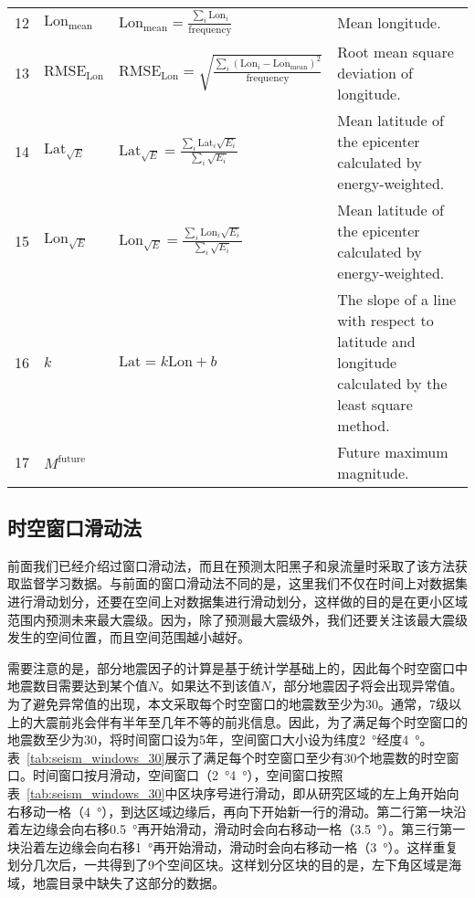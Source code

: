 \begin{table}[htpb]
{\begin{tabular}{llll}
  12 & $\mathrm{Lon}_{\mathrm{mean}}$ & $\displaystyle \mathrm{Lon}_{\mathrm{mean}}=\frac{\sum_i{\mathrm{Lon}_i}}{\mathrm{frequency}}$ & Mean longitude.\\ 
  13 & $\mathrm{RMSE}_{\mathrm{Lon}}$ & $\displaystyle \mathrm{RMSE}_{\mathrm{Lon}}=\sqrt{\frac{\sum_i{(\mathrm{Lon}_i-\mathrm{Lon}_\mathrm{mean})}^2}{\mathrm{frequency}}}$ &  Root mean square deviation of longitude. \\ 
  14 & $\mathrm{Lat}_{\sqrt{E}}$ & $\displaystyle \mathrm{Lat}_{\sqrt{E}}=\frac{\sum_i{\mathrm{Lat}_i\sqrt{E_i}}}{\sum_i{\sqrt{E_i}}}$ & Mean latitude of the epicenter calculated by energy-weighted. \\ 
  15 & $\mathrm{Lon}_{\sqrt{E}}$ & $\displaystyle \mathrm{Lon}_{\sqrt{E}}=\frac{\sum_i{\mathrm{Lon}_i\sqrt{E_i}}}{\sum_i{\sqrt{E_i}}}$ & Mean latitude of the epicenter calculated by energy-weighted.\\ 
  16 & $k$ & $\mathrm{Lat}=k\mathrm{Lon}+b$ & The slope of a line with respect to latitude and longitude calculated by the least square method. \\
  17 & $M^{\mathrm{future}}$ & & Future maximum magnitude. \\
  \bottomrule
  \end{tabular} }
\end{table}


\subsection{时空窗口滑动法}\label{sec_seism:时空窗口滑动法}

前面我们已经介绍过窗口滑动法，而且在预测太阳黑子和泉流量时采取了该方法获取监督学习数据。与前面的窗口滑动法不同的是，这里我们不仅在时间上对数据集进行滑动划分，还要在空间上对数据集进行滑动划分，这样做的目的是在更小区域范围内预测未来最大震级。因为，除了预测最大震级外，我们还要关注该最大震级发生的空间位置，而且空间范围越小越好。

需要注意的是，部分地震因子的计算是基于统计学基础上的，因此每个时空窗口中地震数目需要达到某个值$N$。如果达不到该值$N$，部分地震因子将会出现异常值。为了避免异常值的出现，本文采取每个时空窗口的地震数至少为30。通常，7级以上的大震前兆会伴有半年至几年不等的前兆信息。因此，为了满足每个时空窗口的地震数至少为30，将时间窗口设为5年，空间窗口大小设为纬度\SI{2}{\degree}\times 经度\SI{4}{\degree}。表~\ref{tab:seism_windows_30}展示了满足每个时空窗口至少有30个地震数的时空窗口。时间窗口按月滑动，空间窗口（\SI{2}{\degree}\times \SI{4}{\degree}），空间窗口按照表~\ref{tab:seism_windows_30}中区块序号进行滑动，即从研究区域的左上角开始向右移动一格（\SI{4}{\degree}），到达区域边缘后，再向下开始新一行的滑动。第二行第一块沿着左边缘会向右移\SI{0.5}{\degree}再开始滑动，滑动时会向右移动一格（\SI{3.5}{\degree}）。第三行第一块沿着左边缘会向右移\SI{1}{\degree}再开始滑动，滑动时会向右移动一格（\SI{3}{\degree}）。这样重复划分几次后，一共得到了9个空间区块。这样划分区块的目的是，左下角区域是海域，地震目录中缺失了这部分的数据。

